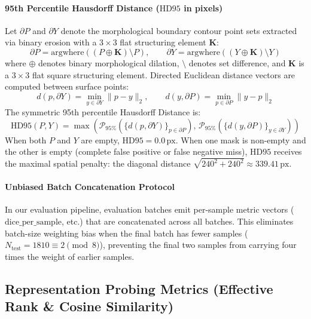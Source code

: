 \documentclass{article}
\begin{document}
\paragraph{95th Percentile Hausdorff Distance ($\text{HD95}$ in pixels)}
Let $\partial P$ and $\partial Y$ denote the morphological boundary contour point sets extracted via binary erosion with a $3 \times 3$ flat structuring element $\mathbf{K}$:
\begin{equation}
    \partial P = \text{argwhere}\left( (P \oplus \mathbf{K}) \setminus P \right), \qquad \partial Y = \text{argwhere}\left( (Y \oplus \mathbf{K}) \setminus Y \right)
\end{equation}
where $\oplus$ denotes binary morphological dilation, $\setminus$ denotes set difference, and $\mathbf{K}$ is a $3 \times 3$ flat square structuring element.
Directed Euclidean distance vectors are computed between surface points:
\begin{equation}
    d(p, \partial Y) = \min_{y \in \partial Y} \|p - y\|_2, \qquad d(y, \partial P) = \min_{p \in \partial P} \|y - p\|_2
\end{equation}
The symmetric 95th percentile Hausdorff Distance is:
\begin{equation}
    \text{HD95}(P, Y) = \max\left( \mathcal{P}_{95\%}\left( \{d(p, \partial Y)\}_{p \in \partial P} \right), \, \mathcal{P}_{95\%}\left( \{d(y, \partial P)\}_{y \in \partial Y} \right) \right)
\end{equation}
When both $P$ and $Y$ are empty, $\text{HD95} = 0.0\,\text{px}$. When one mask is non-empty and the other is empty (complete false positive or false negative miss), $\text{HD95}$ receives the maximal spatial penalty: the diagonal distance $\sqrt{240^2 + 240^2} \approx 339.41\,\text{px}$.

\paragraph{Unbiased Batch Concatenation Protocol}
In our evaluation pipeline, evaluation batches emit per-sample metric vectors ($\text{dice\_per\_sample}$, etc.) that are concatenated across all batches. This eliminates batch-size weighting bias when the final batch has fewer samples ($N_{\text{test}} = 1810 \equiv 2 \pmod 8$), preventing the final two samples from carrying four times the weight of earlier samples.

\subsection{Representation Probing Metrics (Effective Rank \& Cosine Similarity)}
\end{document}
